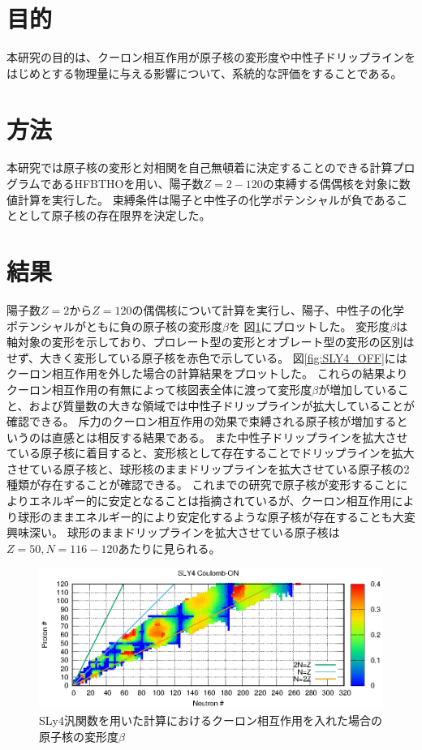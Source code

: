 \documentclass[12pt]{jarticle}
\begin{document}
\section{目的}
本研究の目的は、クーロン相互作用が原子核の変形度や中性子ドリップラインをはじめとする物理量に与える影響について、系統的な評価をすることである。

\section{方法}
本研究では原子核の変形と対相関を自己無頓着に決定することのできる計算プログラムであるHFBTHOを用い、陽子数$Z=2-120$の束縛する偶偶核を対象に数値計算を実行した。
束縛条件は陽子と中性子の化学ポテンシャルが負であることとして原子核の存在限界を決定した。


\section{結果}
陽子数$Z=2$から$Z=120$の偶偶核について計算を実行し、陽子、中性子の化学ポテンシャルがともに負の原子核の変形度$\beta$を 図\ref{fig:SLY4_ON}にプロットした。
変形度$\beta$は軸対象の変形を示しており、プロレート型の変形とオブレート型の変形の区別はせず、大きく変形している原子核を赤色で示している。
図\ref{fig:SLY4_OFF}にはクーロン相互作用を外した場合の計算結果をプロットした。
これらの結果よりクーロン相互作用の有無によって核図表全体に渡って変形度$\beta$が増加していること、および質量数の大きな領域では中性子ドリップラインが拡大していることが確認できる。
斥力のクーロン相互作用の効果で束縛される原子核が増加するというのは直感とは相反する結果である。
また中性子ドリップラインを拡大させている原子核に着目すると、変形核として存在することでドリップラインを拡大させている原子核と、球形核のままドリップラインを拡大させている原子核の2種類が存在することが確認できる。
これまでの研究で原子核が変形することによりエネルギー的に安定となることは指摘されているが、クーロン相互作用により球形のままエネルギー的により安定化するような原子核が存在することも大変興味深い。
球形のままドリップラインを拡大させている原子核は$Z=50,N=116-120$あたりに見られる。
\begin{figure}[ht]
    \centering
    \includegraphics{../SLY4_ON.eps}
    \setlength\floatsep{0pt}
    \setlength\intextsep{0pt} 
    \setlength\textfloatsep{0pt}
    \caption{SLy4汎関数を用いた計算におけるクーロン相互作用を入れた場合の原子核の変形度$\beta$}\label{fig:SLY4_ON}
\end{figure}
\end{document}
